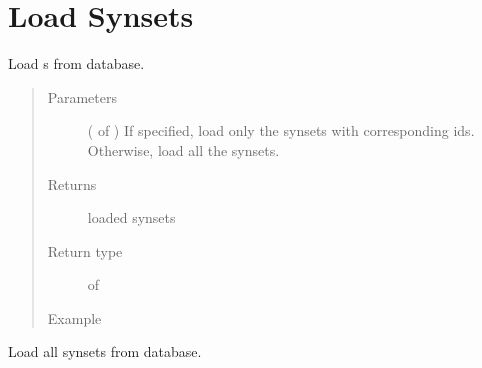 \documentclass[letterpaper,10pt,english]{sphinxmanual}
\begin{document}
\section{Load Synsets}
\label{\detokenize{load:module-loacore.load.synset_load}}\label{\detokenize{load:load-synsets}}

\begin{fulllineitems}
\label{\detokenize{load:loacore.load.synset_load.load_synsets}}
Load {\hyperref[\detokenize{classes:loacore.classes.classes.Synset}]{}} s from database.
\begin{quote}\begin{description}
\item[{Parameters}] \leavevmode
{} ( of {\hyperref[\detokenize{classes:loacore.classes.classes.Word}]{}}) \textendash{} If specified, load only the synsets with corresponding ids. Otherwise, load all the synsets.

\item[{Returns}] \leavevmode
loaded synsets

\item[{Return type}] \leavevmode
{} of {\hyperref[\detokenize{classes:loacore.classes.classes.Synset}]{}}

\item[{Example}] \leavevmode
\end{description}\end{quote}

Load all synsets from database.

%
\begin{sphinxVerbatim}[commandchars=\\\{\}]
   
  
\PYG{p}{[}\PYG{p}{]}
\PYG{p}{[}\PYG{p}{]}
\end{sphinxVerbatim}

\end{fulllineitems}
\end{document}
